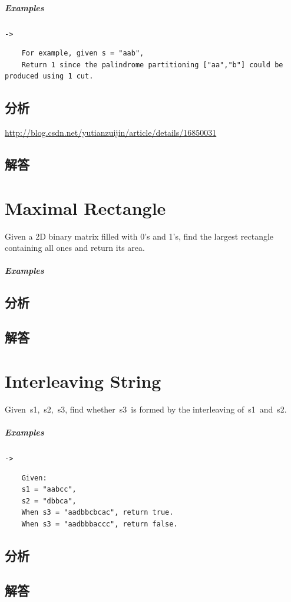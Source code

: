 \documentclass[UTF8,a4paper,12pt]{ctexbook}
\begin{document}
	\subparagraph{Examples}\verb|->|
		\begin{lstlisting}
	For example, given s = "aab",
	Return 1 since the palindrome partitioning ["aa","b"] could be produced using 1 cut.
		\end{lstlisting}
		
	\subsection{分析}
		\url{http://blog.csdn.net/yutianzuijin/article/details/16850031}
		
	\subsection{解答}
	
\section{Maximal Rectangle}
	Given a 2D binary matrix filled with 0’s and 1’s, find the largest rectangle containing all ones and return
	its area.
	
	\subparagraph{Examples}
	
	\subsection{分析}
	
	\subsection{解答}
	
\section{Interleaving String}
	Given s1, s2, s3, find whether s3 is formed by the interleaving of s1 and s2.
	
	\subparagraph{Examples}\verb|->|
		\begin{lstlisting}
	Given:
	s1 = "aabcc",
	s2 = "dbbca",
	When s3 = "aadbbcbcac", return true.
	When s3 = "aadbbbaccc", return false.
		\end{lstlisting}
		
	\subsection{分析}
	
	\subsection{解答}
	
\end{document}
